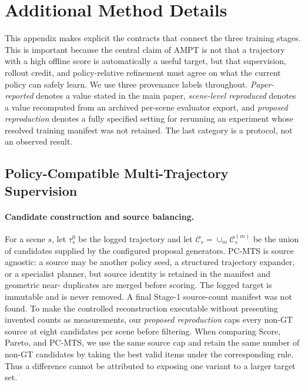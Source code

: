 \section{Additional Method Details}
\label{sec:additional-method}

This appendix makes explicit the contracts that connect the three training
stages.  This is important because the central claim of AMPT is not that a
trajectory with a high offline score is automatically a useful target, but
that supervision, rollout credit, and policy-relative refinement must agree on
what the current policy can safely learn.  We use three provenance labels
throughout.  \emph{Paper-reported} denotes a value stated in the main paper,
\emph{scene-level reproduced} denotes a value recomputed from an archived
per-scene evaluator export, and \emph{proposed reproduction} denotes a fully
specified setting for rerunning an experiment whose resolved training manifest
was not retained.  The last category is a protocol, not an observed result.

\subsection{Policy-Compatible Multi-Trajectory Supervision}
\label{sec:pc-mts-details}

\paragraph{Candidate construction and source balancing.}
For a scene $s$, let $\tau_s^0$ be the logged trajectory and let
$\mathcal C_s=\cup_m\mathcal C_s^{(m)}$ be the union of candidates supplied by
the configured proposal generators.  PC-MTS is source agnostic: a source may
be another policy seed, a structured trajectory expander, or a specialist
planner, but source identity is retained in the manifest and geometric near-
duplicates are merged before scoring.  The logged target is immutable and
is never removed.  A final Stage-1 source-count manifest was not found.  To
make the controlled reconstruction executable without presenting invented
counts as measurements, our \emph{proposed reproduction} caps every non-GT
source at eight candidates per scene before filtering.  When comparing Score,
Pareto, and PC-MTS, we use the same source
cap and retain the same number of non-GT candidates by taking the best valid
items under the corresponding rule.  Thus a difference cannot be attributed
to exposing one variant to a larger target set.


